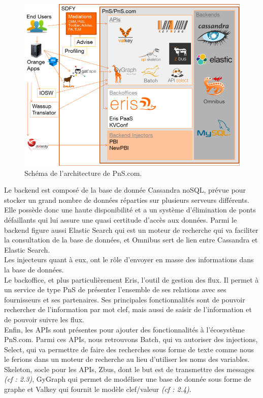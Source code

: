 
\begin{figure}[htp]
  \centering
  \includegraphics[width=15cm]{images/pns/psn.png}
  \caption{Schéma de l'architecture de PnS.com.}
  \label{pns}
\end{figure}


Le backend est composé de la base de donnée Cassandra noSQL, prévue pour stocker un grand nombre de données réparties sur plusieurs serveurs différents. Elle possède donc une haute disponibilité et a un système d'élimination de ponts défaillants qui lui assure une quasi certitude d'accès aux données. Parmi le backend figure aussi Elastic Search qui est un moteur de recherche qui va faciliter la consultation de la base de données, et Omnibus sert de lien entre Cassandra et Elastic Search.\\

Les injecteurs quant à eux, ont le rôle d'envoyer en masse des informations dans la base de données.\\

Le backoffice, et plus particulièrement Eris, l'outil de gestion des flux. Il permet à un service de type PnS de présenter l'ensemble de ses relations avec ses fournisseurs et ses partenaires. Ses principales fonctionnalités sont de pouvoir rechercher de l'information par mot clef, mais aussi de saisir de l'information et de pouvoir suivre les flux.\\

Enfin, les APIs sont présentes pour ajouter des fonctionnalités à l'écosystème PnS.com. Parmi ces APIs, nous retrouvons Batch, qui va autoriser des injections, Select, qui va permettre de faire des recherches sous forme de texte comme nous le ferions dans un moteur de recherche au lieu d'utiliser les noms des variables. Skeleton, socle pour les APIs, Zbus, dont le but est de transmettre des messages \textit{(cf : 2.3)}, GyGraph qui permet de modéliser une base de donnée sous forme de graphe et Valkey qui fournit le modèle clef/valeur \textit{(cf : 2.4)}.\\

